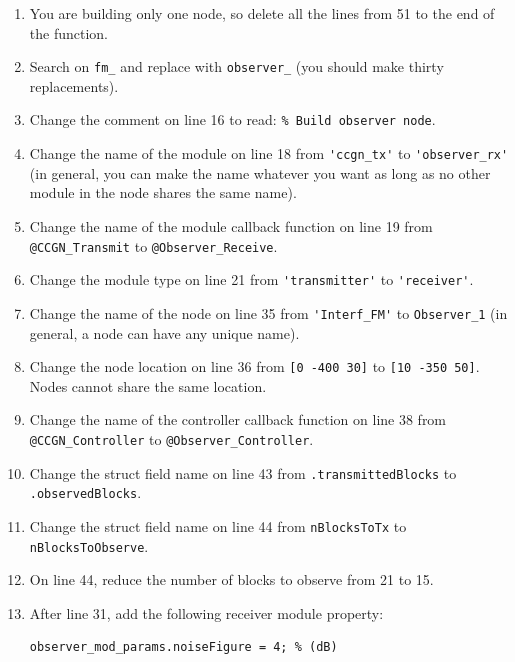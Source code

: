 \setcounter{enumitemp}{\theenumi}
\begin{enumerate}
\setcounter{enumi}{\theenumitemp}

\item You are building only one node, so delete all the lines from 51 to the end of the function.

\item Search on \verb+fm_+ and replace with \verb+observer_+ (you should make thirty replacements).

\item Change the comment on line 16 to read: \verb+% Build observer node+.

\item Change the name of the module on line 18 from \verb+'ccgn_tx'+ to \verb+'observer_rx'+ (in general, you can make the name whatever you want as long as no other module in the node shares the same name).

\item Change the name of the module callback function on line 19 from \verb+@CCGN_Transmit+ to \verb+@Observer_Receive+.

\item Change the module type on line 21 from \verb+'transmitter'+ to \verb+'receiver'+.

\item Change the name of the node on line 35 from \verb+'Interf_FM'+ to \verb+Observer_1+ (in general, a node can have any unique name).

\item Change the node location on line 36 from \verb+[0 -400 30]+ to \verb+[10 -350 50]+. Nodes cannot share the same location.

\item Change the name of the controller callback function on line 38 from \verb+@CCGN_Controller+ to \verb+@Observer_Controller+.

\item Change the struct field name on line 43 from \verb+.transmittedBlocks+ to \verb+.observedBlocks+.

\item Change the struct field name on line 44 from \verb+nBlocksToTx+ to \verb+nBlocksToObserve+.

\item On line 44, reduce the number of blocks to observe from 21 to 15.

\item After line 31, add the following receiver module property:
%
\begin{lstlisting}[numbers=none]
observer_mod_params.noiseFigure = 4; % (dB)
\end{lstlisting}

\end{enumerate}

